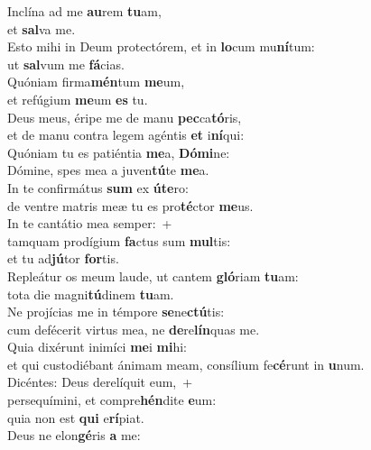 \evenverse Inclína ad me \textbf{au}rem \textbf{tu}am,~\*\\
\evenverse et \textbf{sal}va me.\\
\oddverse Esto mihi in Deum protectórem, et in \textbf{lo}cum mu\textbf{ní}tum:~\*\\
\oddverse ut \textbf{sal}vum me \textbf{fá}cias.\\
\evenverse Quóniam firma\textbf{mén}tum \textbf{me}um,~\*\\
\evenverse et refúgium \textbf{me}um \textbf{es} tu.\\
\oddverse Deus meus, éripe me de manu \textbf{pec}ca\textbf{tó}ris,~\*\\
\oddverse et de manu contra legem agéntis \textbf{et} i\textbf{ní}qui:\\
\evenverse Quóniam tu es patiéntia \textbf{me}a, \textbf{Dó}\textbf{mi}ne:~\*\\
\evenverse Dómine, spes mea a juven\textbf{tú}te \textbf{me}a.\\
\oddverse In te confirmátus \textbf{sum} ex \textbf{ú}\textbf{te}ro:~\*\\
\oddverse de ventre matris meæ tu es pro\textbf{té}ctor \textbf{me}us.\\
\evenverse In te cantátio mea semper:~+\\
\evenverse  tamquam prodígium \textbf{fa}ctus sum \textbf{mul}tis:~\*\\
\evenverse et tu ad\textbf{jú}tor \textbf{for}tis.\\
\oddverse Repleátur os meum laude, ut cantem \textbf{gló}riam \textbf{tu}am:~\*\\
\oddverse tota die magni\textbf{tú}dinem \textbf{tu}am.\\
\evenverse Ne projícias me in témpore \textbf{se}ne\textbf{ctú}tis:~\*\\
\evenverse cum defécerit virtus mea, ne \textbf{de}re\textbf{lín}quas me.\\
\oddverse Quia dixérunt inimíci \textbf{me}i \textbf{mi}hi:~\*\\
\oddverse et qui custodiébant ánimam meam, consílium fe\textbf{cé}runt in \textbf{u}num.\\
\evenverse Dicéntes: Deus derelíquit eum,~+\\
\evenverse  persequímini, et compre\textbf{hén}dite \textbf{e}um:~\*\\
\evenverse quia non est \textbf{qui} e\textbf{rí}piat.\\
\oddverse Deus ne elon\textbf{gé}ris \textbf{a} me:~\*\\
